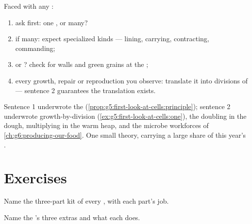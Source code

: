 \begin{method}\label{met:g6:cell-unit-of-life:read}
Faced with any :
\begin{enumerate}
  \item ask first: one , or many?
  \item if many: expect specialized kinds --- lining,
        carrying, contracting, commanding;
  \item {} or ? check for walls and green grains
        at the ;
  \item every growth, repair or reproduction you observe:
        translate it into divisions of  --- sentence 2
        guarantees the translation exists.
\end{enumerate}
\end{method}

\begin{example}\label{ex:g6:cell-unit-of-life:atwork}
Sentence 1 underwrote the 
(\cref{prop:g5:first-look-at-cells:principle}); sentence 2
underwrote growth-by-division
(\cref{ex:g5:first-look-at-cells:one}), the  doubling
in the dough,  multiplying in the warm heap,
and the microbe workforces of
\cref{ch:g6:producing-our-food}. One small theory, carrying
a large share of this year's .
\end{example}

\section{Exercises}

\begin{exercise}[$\star$]\label{exo:g6:cell-unit-of-life:1}
Name the three-part kit of every , with each part's
job.
\end{exercise}

\begin{exercise}[$\star$]\label{exo:g6:cell-unit-of-life:2}
Name the  's three extras and what each does.
\end{exercise}

